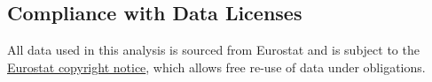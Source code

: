 \documentclass{article}
\begin{document}

\subsection*{Compliance with Data Licenses}
All data used in this analysis is sourced from Eurostat and is subject to the
\href{https://ec.europa.eu/eurostat/about-us/policies/copyright}{Eurostat copyright notice},
which allows free re-use of data under obligations.
\end{document}
